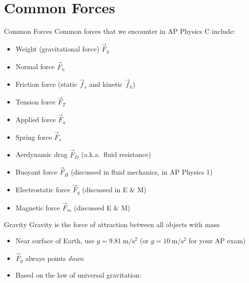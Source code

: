 \documentclass[12pt,compress,aspectratio=169]{beamer}
\begin{document}
\section{Common Forces}

\begin{frame}{Common Forces}
  Common forces that we encounter in AP Physics C include:
  \begin{itemize}
  \item Weight (gravitational force) $\vec F_g$
  \item Normal force $\vec F_n$
  \item Friction force (static $\vec f_s$ and kinetic $\vec f_k$)
  \item Tension force $\vec F_T$
  \item Applied force $\vec F_a$
  \item Spring force $\vec F_s$
  \item Aerdynamic drag $\vec F_D$ (a.k.a.\ fluid resistance)
  \item Buoyant force $\vec F_B$ (discussed in fluid mechanics, in AP Physics 1)
  \item Electrostatic force $\vec F_q$ (discussed in E \& M)
  \item Magnetic force $\vec F_m$ (discussed E \& M)
  \end{itemize}
\end{frame}



\begin{frame}{Gravity}
  Gravity is the force of attraction between all objects with mass
    
  \begin{itemize}
  \item Near surface of Earth, use $g=\SI{9.81}{\metre\per\second\squared}$ (or
    $g=\SI{10}{\metre\per\second\squared}$ for your AP exam)
  \item $\vec F_g$ always points \emph{down}
  \item Based on the law of universal gravitation:

  \end{itemize}    
\end{frame}
\end{document}
